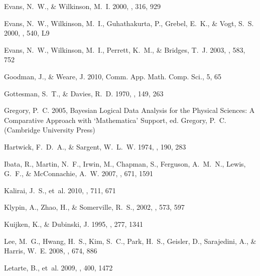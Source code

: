 \documentclass[preprint]{aastex}
\begin{document}
\begin{thebibliography}{}
{Evans}, N.~W., \& {Wilkinson}, M.~I. 2000, \mnras, 316, 929

{Evans}, N.~W., {Wilkinson}, M.~I., {Guhathakurta}, P., {Grebel}, E.~K., \&
  {Vogt}, S.~S. 2000, \apjl, 540, L9

{Evans}, N.~W., {Wilkinson}, M.~I., {Perrett}, K.~M., \& {Bridges}, T.~J. 2003,
  \apj, 583, 752

Goodman, J., \& Weare, J. 2010, Comm. App. Math. Comp. Sci., 5, 65

{Gottesman}, S.~T., \& {Davies}, R.~D. 1970, \mnras, 149, 263

{Gregory}, P.~C. 2005, {Bayesian Logical Data Analysis for the Physical
  Sciences: A Comparative Approach with `Mathematica' Support}, ed. {Gregory,
  P.~C.} (Cambridge University Press)

{Hartwick}, F.~D.~A., \& {Sargent}, W.~L.~W. 1974, \apj, 190, 283

{Ibata}, R., {Martin}, N.~F., {Irwin}, M., {Chapman}, S., {Ferguson}, A.~M.~N.,
  {Lewis}, G.~F., \& {McConnachie}, A.~W. 2007, \apj, 671, 1591

{Kalirai}, J.~S., {et~al.} 2010, \apj, 711, 671

{Klypin}, A., {Zhao}, H., \& {Somerville}, R.~S.,
2002, \apj, 573, 597

{Kuijken}, K., \& {Dubinski}, J. 1995, \mnras, 277, 1341

{Lee}, M.~G., {Hwang}, H.~S., {Kim}, S.~C., {Park}, H.~S., {Geisler}, D.,
  {Sarajedini}, A., \& {Harris}, W.~E. 2008, \apj, 674, 886

{Letarte}, B., {et~al.} 2009, \mnras, 400, 1472


\end{thebibliography}
\end{document}
